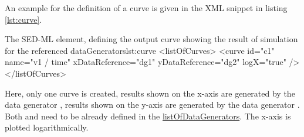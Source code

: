 An example for the definition of a curve is given in the XML snippet in listing \ref{lst:curve}.
%
\begin{myXmlLst}{The SED-ML  element, defining the output curve showing the result of simulation for the referenced dataGenerators}{lst:curve}
<listOfCurves>
  <curve id="c1" name="v1 / time" xDataReference="dg1" yDataReference="dg2" logX="true" />
</listOfCurves>
\end{myXmlLst}
Here, only one curve is created, results shown on the x-axis are generated by the data generator , results shown on the y-axis are generated by the data generator . Both  and  need to be already defined in the \hyperref[sec:listOfDataGenerators]{listOfDataGenerators}. The x-axis is plotted logarithmically.


